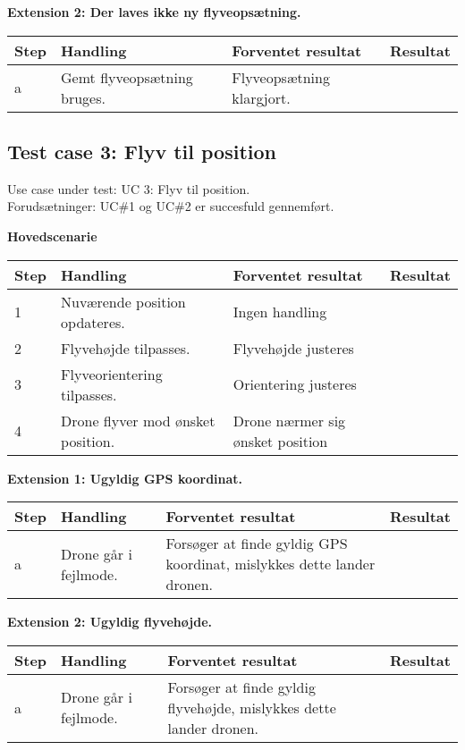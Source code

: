 \textbf{Extension 2: Der laves ikke ny flyveopsætning.}
\begin{table}[H]
	\centering
		\begin{tabular}{|l|p{5 cm}|p{5 cm}|p{3.5 cm}|} 
		\hline
			Step & Handling & Forventet resultat & Resultat\\ \hline
			a & Gemt flyveopsætning bruges. & Flyveopsætning klargjort. & \\ \hline
		\end{tabular}
\end{table}

\newpage

\subsection*{Test case 3: Flyv til position}
Use case under test: UC 3: Flyv til position.\\
Forudsætninger:	UC\#1 og UC\#2 er succesfuld gennemført.

\textbf{Hovedscenarie}
\begin{table}[H]
	\centering
		\begin{tabular}{|l|p{5 cm}|p{5 cm}|p{3.5 cm}|} 
		\hline
			Step & Handling & Forventet resultat & Resultat\\ \hline
			1 & Nuværende position opdateres. & Ingen handling  &  \\ \hline
			2 & Flyvehøjde tilpasses. & Flyvehøjde justeres &  \\ \hline
			3 & Flyveorientering tilpasses. & Orientering justeres &  \\ \hline
			4 & Drone flyver mod ønsket position. & Drone nærmer sig ønsket position  &  \\ \hline
		\end{tabular}
\end{table}

\textbf{Extension 1: Ugyldig GPS koordinat.}
\begin{table}[H]
	\centering
		\begin{tabular}{|l|p{5 cm}|p{5 cm}|p{3.5 cm}|} 
		\hline
			Step & Handling & Forventet resultat & Resultat\\ \hline
			a & Drone går i fejlmode. & Forsøger at finde gyldig GPS koordinat, mislykkes dette lander dronen. & \\ \hline
		\end{tabular}
\end{table}

\textbf{Extension 2: Ugyldig flyvehøjde.}
\begin{table}[H]
	\centering
		\begin{tabular}{|l|p{5 cm}|p{5 cm}|p{3.5 cm}|} 
		\hline
			Step & Handling & Forventet resultat & Resultat\\ \hline
			a & Drone går i fejlmode. & Forsøger at finde gyldig flyvehøjde, mislykkes dette lander dronen. & \\ \hline
		\end{tabular}
\end{table}


